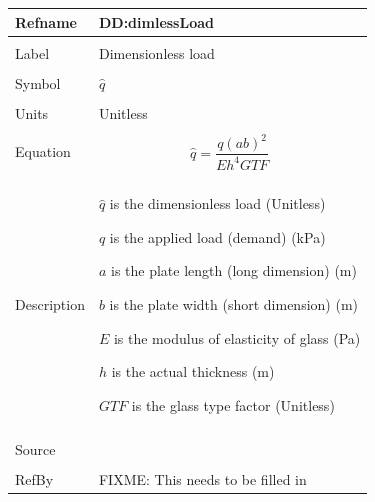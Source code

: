 \documentclass[12pt]{article}
\begin{document}
\noindent \begin{minipage}{\textwidth}
\begin{tabular}{p{} p{}}
\toprule \textbf{Refname} & \textbf{DD:dimlessLoad}
\label{DD:dimlessLoad}
\\ \midrule \\
Label & Dimensionless load
\\ \midrule \\
Symbol & $\hat{q}$
\\ \midrule \\
Units & Unitless
\\ \midrule \\
Equation & \begin{dmath}
           \hat{q}=\frac{q \left(a b\right)^{2}}{E h^{4} GTF}
           \end{dmath}
\\ \midrule \\
Description & \begin{symbDescription}
              \item{$\hat{q}$ is the dimensionless load (Unitless)}
              \item{$q$ is the applied load (demand) (kPa)}
              \item{$a$ is the plate length (long dimension) (m)}
              \item{$b$ is the plate width (short dimension) (m)}
              \item{$E$ is the modulus of elasticity of glass (Pa)}
              \item{$h$ is the actual thickness (m)}
              \item{$GTF$ is the glass type factor (Unitless)}
              \end{symbDescription}
\\ \midrule \\
Source & 
\\ \midrule \\
RefBy & FIXME: This needs to be filled in
\\ \bottomrule \end{tabular}
\end{minipage}\\
~\newline
\end{document}
